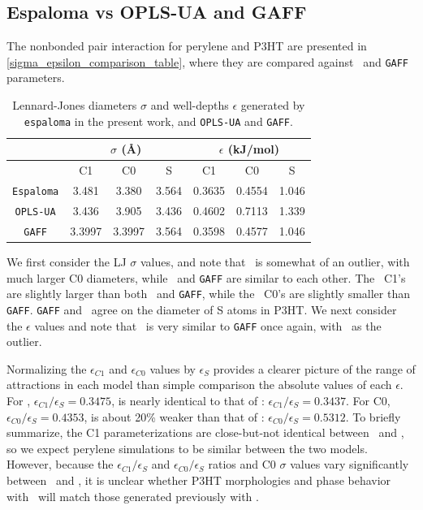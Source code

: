 \subsection{Espaloma vs OPLS-UA and GAFF}
The nonbonded pair interaction for perylene and P3HT are presented in \autoref{sigma_epsilon_comparison_table}, where they are compared against \oplsff~and \texttt{GAFF} parameters. 
\begin{table}[h!]
    \centering
    \caption{Lennard-Jones diameters $\sigma$ and well-depths $\epsilon$ generated by \texttt{espaloma} in the present work, and \texttt{OPLS-UA} and \texttt{GAFF}.}
    \begin{tabular}{c c c c|c c c} 
    & \multicolumn{3}{c}{$\sigma$ (\AA)} &  \multicolumn{3}{c}{$\epsilon$ (kJ/mol)}  \\
    \hline
        &  C1      &   C0      &   S &   C1      &   C0      &   S   \\
    \hline
    \texttt{Espaloma}    &   3.481   &   3.380   &   3.564  & 0.3635  & 0.4554  & 1.046   \\
    \texttt{OPLS-UA}     &   3.436   &   3.905   &   3.436  & 0.4602  & 0.7113  &  1.339   \\
    \texttt{GAFF}        &   3.3997  &   3.3997  &   3.564  & 0.3598  & 0.4577  &    1.046   \\
    \end{tabular}
    \label{sigma_epsilon_comparison_table}
\end{table}
We first consider the LJ $\sigma$ values, and note that \oplsff~is somewhat of an outlier, with much larger C0 diameters, while \espff~and \texttt{GAFF} are similar to each other. 
The \espff~C1's are slightly larger than both \oplsff~and \texttt{GAFF}, while the \espff~C0's are slightly smaller than \texttt{GAFF}.
\texttt{GAFF} and \espff~agree on the diameter of S atoms in P3HT.
We next consider the $\epsilon$ values and note that \espff~is very similar to \texttt{GAFF} once again, with \oplsff~as the outlier.

Normalizing the $\epsilon_{C1}$ and $\epsilon_{C0}$ values by $\epsilon_{S}$ provides a clearer picture of the range of attractions in each model than simple comparison the absolute values of each $\epsilon$.
For \espff, $\epsilon_{C1}/\epsilon_{S}=0.3475$, is nearly identical to that of \oplsff: $\epsilon_{C1}/\epsilon_{S}=0.3437$.
For C0, \espff~$\epsilon_{C0}/\epsilon_{S}=0.4353$, is about 20\% weaker than that of \oplsff: $\epsilon_{C0}/\epsilon_{S}=0.5312$.
To briefly summarize, the C1 parameterizations are close-but-not identical between \espff~and \oplsff, so we expect perylene simulations to be similar between the two models.
However, because the $\epsilon_{C1}/\epsilon_{S}$ and $\epsilon_{C0}/\epsilon_{S}$ ratios and C0 $\sigma$ values vary significantly between \espff~and \oplsff, it is unclear whether P3HT morphologies and phase behavior with \espff~will match those generated previously with \oplsff.

